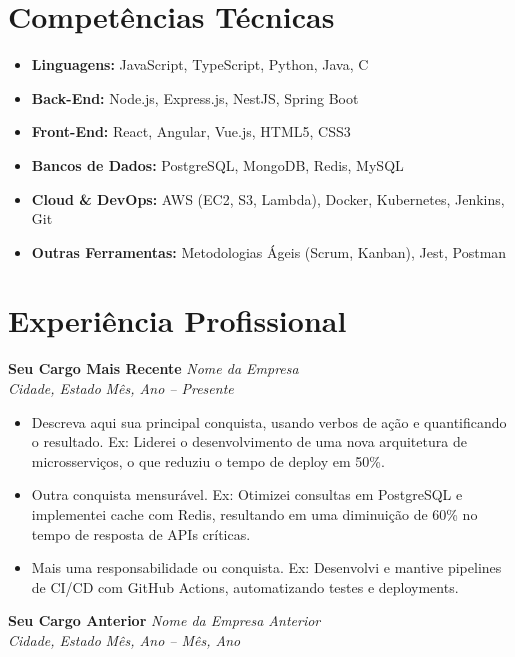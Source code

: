 \documentclass[a4paper,11pt]{article}
\newcommand{\resumeEntry}[4]{
  \vspace{4pt}
  \textbf{#1} \hfill \textit{#2} \\
  \textit{#3} \hfill \textit{#4} \\
}
\begin{document}
\section{Competências Técnicas}
\begin{itemize}[leftmargin=*, label={}]
    \item \textbf{Linguagens:} JavaScript, TypeScript, Python, Java, C
    \item \textbf{Back-End:} Node.js, Express.js, NestJS, Spring Boot
    \item \textbf{Front-End:} React, Angular, Vue.js, HTML5, CSS3
    \item \textbf{Bancos de Dados:} PostgreSQL, MongoDB, Redis, MySQL
    \item \textbf{Cloud \& DevOps:} AWS (EC2, S3, Lambda), Docker, Kubernetes, Jenkins, Git
    \item \textbf{Outras Ferramentas:} Metodologias Ágeis (Scrum, Kanban), Jest, Postman
\end{itemize}


\section{Experiência Profissional}

\resumeEntry
  {Seu Cargo Mais Recente} %
  {Nome da Empresa} %
  {Cidade, Estado} %
  {Mês, Ano – Presente} %

\begin{itemize}[leftmargin=*, topsep=2pt, itemsep=2pt]
    \item Descreva aqui sua principal conquista, usando verbos de ação e quantificando o resultado. Ex: Liderei o desenvolvimento de uma nova arquitetura de microsserviços, o que reduziu o tempo de deploy em 50\%.
    \item Outra conquista mensurável. Ex: Otimizei consultas em PostgreSQL e implementei cache com Redis, resultando em uma diminuição de 60\% no tempo de resposta de APIs críticas.
    \item Mais uma responsabilidade ou conquista. Ex: Desenvolvi e mantive pipelines de CI/CD com GitHub Actions, automatizando testes e deployments.
\end{itemize}

\resumeEntry
  {Seu Cargo Anterior} %
  {Nome da Empresa Anterior} %
  {Cidade, Estado} %
  {Mês, Ano – Mês, Ano} %
\end{document}
